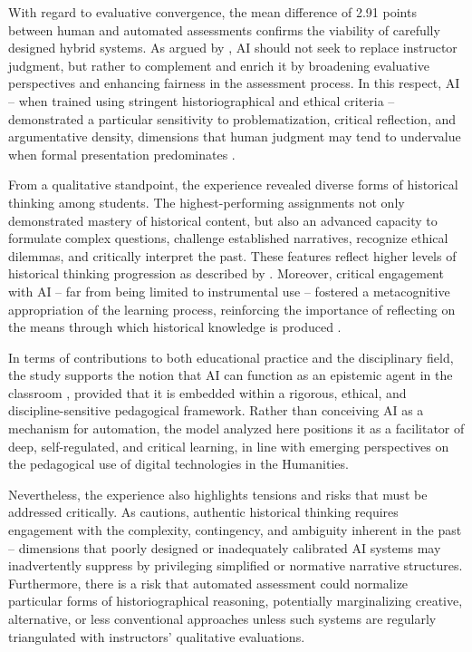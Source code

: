 \documentclass[english]{textolivre}
\begin{document}
With regard to evaluative convergence, the mean difference of 2.91 points between human and automated assessments confirms the viability of carefully designed hybrid systems. As argued by \textcite{luckin2016}, AI should not seek to replace instructor judgment, but rather to complement and enrich it by broadening evaluative perspectives and enhancing fairness in the assessment process. In this respect, AI -- when trained using stringent historiographical and ethical criteria -- demonstrated a particular sensitivity to problematization, critical reflection, and argumentative density, dimensions that human judgment may tend to undervalue when formal presentation predominates \cite{carrasco2024, selwyn2021, toktas2025}.

From a qualitative standpoint, the experience revealed diverse forms of historical thinking among students. The highest-performing assignments not only demonstrated mastery of historical content, but also an advanced capacity to formulate complex questions, challenge established narratives, recognize ethical dilemmas, and critically interpret the past. These features reflect higher levels of historical thinking progression as described by \textcite{seixas2013}. Moreover, critical engagement with AI -- far from being limited to instrumental use -- fostered a metacognitive appropriation of the learning process, reinforcing the importance of reflecting on the means through which historical knowledge is produced \cite{carrasco2023, carretero2024, leme2023, tirado2023}.

In terms of contributions to both educational practice and the disciplinary field, the study supports the notion that AI can function as an epistemic agent in the classroom \cite{holmes2019, washburn2024}, provided that it is embedded within a rigorous, ethical, and discipline-sensitive pedagogical framework. Rather than conceiving AI as a mechanism for automation, the model analyzed here positions it as a facilitator of deep, self-regulated, and critical learning, in line with emerging perspectives on the pedagogical use of digital technologies in the Humanities.

Nevertheless, the experience also highlights tensions and risks that must be addressed critically. As \textcite{wineburg2001} cautions, authentic historical thinking requires engagement with the complexity, contingency, and ambiguity inherent in the past -- dimensions that poorly designed or inadequately calibrated AI systems may inadvertently suppress by privileging simplified or normative narrative structures. Furthermore, there is a risk that automated assessment could normalize particular forms of historiographical reasoning, potentially marginalizing creative, alternative, or less conventional approaches unless such systems are regularly triangulated with instructors’ qualitative evaluations.
\end{document}
